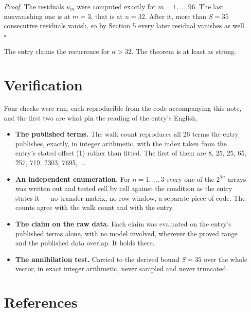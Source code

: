\documentclass[11pt]{article}
\theoremstyle{definition}
\begin{document}
{\itshape Proof.} The residuals $u_m$ were computed exactly for $m = 1,\dots,96$. The last nonvanishing one is at $m = 3$, that is at $n = 32$. After it, more than $S = 35$ consecutive residuals vanish, so by Section 5 every later residual vanishes as well. $\square$

The entry claims the recurrence for $n > 32$. The theorem is at least as strong.

\section{Verification}

Four checks were run, each reproducible from the code accompanying this note, and the first two are what pin the reading of the entry's English.

\begin{itemize}

\item {\bfseries The published terms.} The walk count reproduces all 26 terms the entry publishes, exactly, in integer arithmetic, with the index taken from the entry's stated offset (1) rather than fitted. The first of them are 8, 25, 25, 65, 257, 719, 2303, 7695,~\dots

\item {\bfseries An independent enumeration.} For $n = 1,\dots,3$ every one of the $2^{5n}$ arrays was written out and tested cell by cell against the condition as the entry states it --- no transfer matrix, no row window, a separate piece of code. The counts agree with the walk count and with the entry.

\item {\bfseries The claim on the raw data.} Each claim was evaluated on the entry's published terms alone, with no model involved, wherever the proved range and the published data overlap. It holds there.

\item {\bfseries The annihilation test.} Carried to the derived bound $S = 35$ over the whole vector, in exact integer arithmetic, never sampled and never truncated.

\end{itemize}

\section{References}
\end{document}
